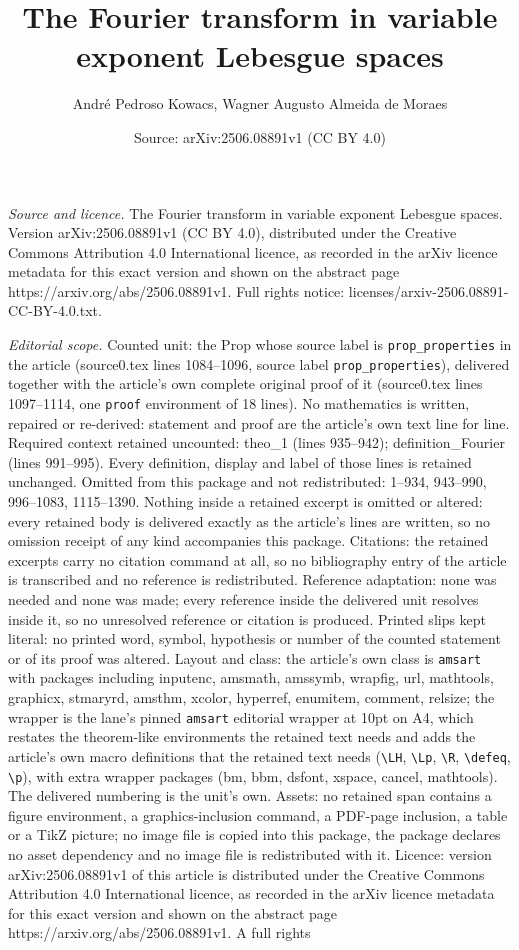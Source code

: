 \documentclass[10pt,a4paper]{amsart}
\title[The Fourier transform in variable exponent Lebesgue spaces]{The Fourier transform in variable exponent Lebesgue spaces}
\author{Andr\'e Pedroso Kowacs, Wagner Augusto Almeida de Moraes}
\date{Source: arXiv:2506.08891v1 (CC BY 4.0)}
\begin{document}
\maketitle

\noindent\emph{Source and licence.} The Fourier transform in variable exponent Lebesgue spaces. Version arXiv:2506.08891v1 (CC BY 4.0), distributed under the Creative Commons Attribution 4.0 International licence, as recorded in the arXiv licence metadata for this exact version and shown on the abstract page https://arxiv.org/abs/2506.08891v1. Full rights notice: licenses/arxiv-2506.08891-CC-BY-4.0.txt.\par\smallskip

\noindent\textit{Editorial scope.} Counted unit: the Prop whose source label is \texttt{prop\_properties} in the article (source0.tex lines 1084--1096, source label \texttt{prop\_properties}), delivered together with the article's own complete original proof of it (source0.tex lines 1097--1114, one \texttt{proof} environment of 18 lines). No mathematics is written, repaired or re-derived: statement and proof are the article's own text line for line. Required context retained uncounted: theo\_1 (lines 935--942); definition\_Fourier (lines 991--995). Every definition, display and label of those lines is retained unchanged. Omitted from this package and not redistributed: 1--934, 943--990, 996--1083, 1115--1390. Nothing inside a retained excerpt is omitted or altered: every retained body is delivered exactly as the article's lines are written, so no omission receipt of any kind accompanies this package. Citations: the retained excerpts carry no citation command at all, so no bibliography entry of the article is transcribed and no reference is redistributed. Reference adaptation: none was needed and none was made; every reference inside the delivered unit resolves inside it, so no unresolved reference or citation is produced. Printed slips kept literal: no printed word, symbol, hypothesis or number of the counted statement or of its proof was altered. Layout and class: the article's own class is \texttt{amsart} with packages including inputenc, amsmath, amssymb, wrapfig, url, mathtools, graphicx, stmaryrd, amsthm, xcolor, hyperref, enumitem, comment, relsize; the wrapper is the lane's pinned \texttt{amsart} editorial wrapper at 10pt on A4, which restates the theorem-like environments the retained text needs and adds the article's own macro definitions that the retained text needs (\texttt{\textbackslash LH}, \texttt{\textbackslash Lp}, \texttt{\textbackslash R}, \texttt{\textbackslash defeq}, \texttt{\textbackslash p}), with extra wrapper packages (bm, bbm, dsfont, xspace, cancel, mathtools). The delivered numbering is the unit's own. Assets: no retained span contains a figure environment, a graphics-inclusion command, a PDF-page inclusion, a table or a TikZ picture; no image file is copied into this package, the package declares no asset dependency and no image file is redistributed with it. Licence: version arXiv:2506.08891v1 of this article is distributed under the Creative Commons Attribution 4.0 International licence, as recorded in the arXiv licence metadata for this exact version and shown on the abstract page https://arxiv.org/abs/2506.08891v1. A full rights 
\end{document}
